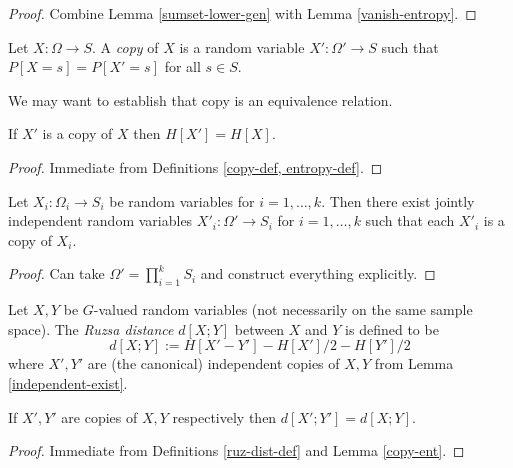 \begin{proof} Combine Lemma \ref{sumset-lower-gen} with Lemma \ref{vanish-entropy}.
\end{proof}

\begin{definition}[Copy]\label{copy-def}  Let $X : \Omega \to S$.  A \emph{copy} of $X$ is a random variable $X' : \Omega' \to S$ such that $P[X=s] = P[X'=s]$ for all $s \in S$.
\end{definition}

We may want to establish that copy is an equivalence relation.

\begin{lemma}\label{copy-ent} If $X'$ is a copy of $X$ then $H[X'] = H[X]$.
\end{lemma}

\begin{proof} Immediate from Definitions \ref{copy-def, entropy-def}.
\end{proof}

\begin{lemma}\label{independent-exist}  Let $X_i : \Omega_i \to S_i$ be random variables for $i=1,\dots,k$.  Then there exist jointly independent random variables $X'_i: \Omega' \to S_i$ for $i=1,\dots,k$ such that each $X'_i$ is a copy of $X_i$.
\end{lemma}

\begin{proof} Can take $\Omega' = \prod_{i=1}^k S_i$ and construct everything explicitly.
\end{proof}

\begin{definition}\label{ruz-dist-def}  Let $X,Y$ be $G$-valued random variables (not necessarily on the same sample space).  The \emph{Ruzsa distance} $d[X;Y]$ between $X$ and $Y$ is defined to be
$$ d[X;Y] := H[X' - Y'] - H[X']/2 - H[Y']/2$$
where $X',Y'$ are (the canonical) independent copies of $X,Y$ from Lemma \ref{independent-exist}.
\end{definition}

\begin{lemma}\label{ruz-copy}  If $X',Y'$ are copies of $X,Y$ respectively then $d[X';Y']=d[X;Y]$.
\end{lemma}

\begin{proof}  Immediate from Definitions \ref{ruz-dist-def} and Lemma \ref{copy-ent}.
\end{proof}

